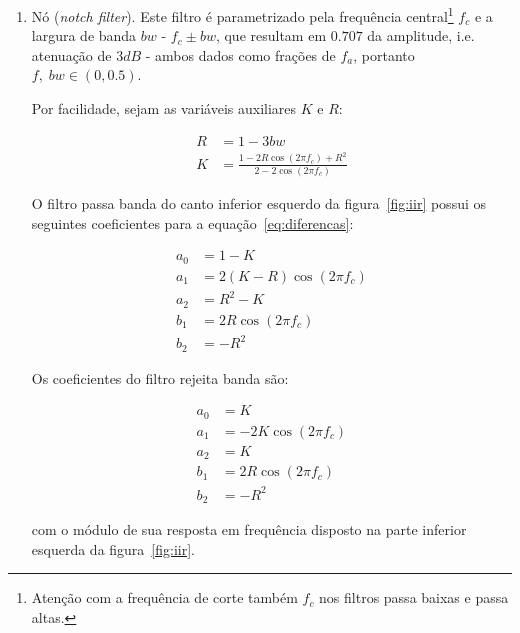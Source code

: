 \begin{enumerate}
\item Nó (\emph{notch filter}). Este filtro é parametrizado
pela frequência central\footnote{ Atenção com a frequência de corte também $f_c$ nos filtros passa baixas e passa altas.} $f_c$
e a largura de banda $bw$
- $f_c \pm bw$, que resultam em $0.707$ da amplitude, i.e. atenuação de $3dB$ -
ambos dados como frações de $f_a$, portanto $f,\; bw \in (0,0.5)$.

Por facilidade, sejam as variáveis auxiliares $K$ e $R$:

\begin{equation}\label{eq:varAux}
\begin{split}
R & = 1 - 3bw \\
K & = \frac{1-2R\cos(2\pi f_c) + R^2}{2 - 2 \cos (2 \pi f_c)}
\end{split}
\end{equation}

O filtro passa banda do canto inferior esquerdo da figura~\ref{fig:iir}
possui os seguintes coeficientes para a equação~\ref{eq:diferencas}:

\begin{equation}\label{eq:passa-banda}
\begin{split}
a_0 & =  1 - K \\
a_1 & =  2(K-R)\cos (2\pi f_c) \\
a_2 & =  R^2-K \\
b_1 & =  2R \cos (2\pi f_c) \\
b_2 & =  -R^2
\end{split}
\end{equation}

Os coeficientes do filtro rejeita banda são:

\begin{equation}\label{eq:rejeita-banda}
\begin{split}
a_0 & =  K \\
a_1 & =  -2K\cos (2\pi f_c) \\
a_2 & =  K \\
b_1 & =  2R \cos (2\pi f_c) \\
b_2 & =  -R^2
\end{split}
\end{equation}

com o módulo de sua resposta em frequência 
disposto na parte inferior esquerda da figura~\ref{fig:iir}.


\end{enumerate}

